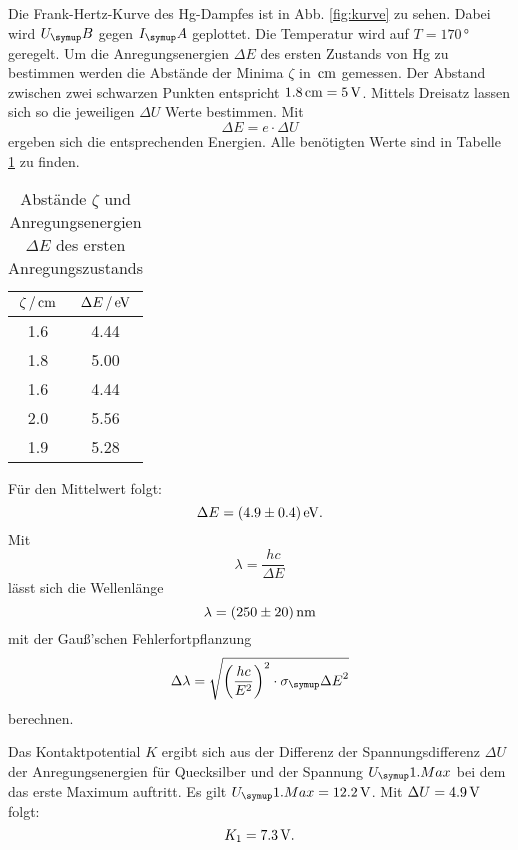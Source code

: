 Die Frank-Hertz-Kurve des Hg-Dampfes ist in Abb. \ref{fig:kurve} zu sehen.
Dabei wird $U_\su{B}$ gegen $I_\su{A}$ geplottet.
Die Temperatur wird auf $T=170\,\si{\degree}$ geregelt. Um die Anregungsenergien
$\Delta E$
des ersten Zustands von Hg zu bestimmen werden die Abstände der Minima $\zeta$ in
$\,\si{\centi\meter}$ gemessen. Der Abstand zwischen zwei schwarzen Punkten entspricht
$1.8\,\si{\centi\meter} = 5\,\si{\volt}$. Mittels Dreisatz lassen sich so die jeweiligen $\Delta U$
Werte bestimmen. Mit
\begin{equation}
  \Delta E = e\cdot \Delta U
\end{equation}
ergeben sich die entsprechenden Energien. Alle benötigten Werte sind in Tabelle
\ref{tab:werte} zu finden.
\begin{table}
  \centering
  \begin{tabular}{c c}
    \toprule
    $\zeta \,/\,\si{\centi\meter}$   & $\Delta E \,/\,\si{\electronvolt}$  \\
    \midrule
    1.6 & 4.44 \\
    1.8 & 5.00 \\
    1.6 & 4.44 \\
    2.0 & 5.56 \\
    1.9 & 5.28 \\
    \bottomrule
  \end{tabular}
  \caption{Abstände $\zeta$ und Anregungsenergien $\Delta E$ des ersten Anregungszustands}
  \label{tab:werte}
\end{table}
Für den Mittelwert folgt:
\begin{equation*}
  \Delta E = (4.9 \pm 0.4) \,\si{\electronvolt}.
\end{equation*}
Mit
\begin{equation}
  \lambda = \frac{hc}{\Delta E} \label{eqn:lambda}
\end{equation}
lässt sich die Wellenlänge
\begin{equation*}
  \lambda = (250 \pm 20)\,\si{\nano\meter}
\end{equation*}
mit der Gauß'schen Fehlerfortpflanzung
\begin{equation*}
  \Delta \lambda = \sqrt{\bigg(\frac{hc}{E^2}\bigg)^2\cdot \sigma_\su{\Delta E}^2}
\end{equation*}
berechnen.

Das Kontaktpotential $K$ ergibt sich aus der Differenz der Spannungsdifferenz $\Delta U$
der Anregungsenergien für Quecksilber und der Spannung $U_\su{1.Max}$ bei dem das
erste Maximum auftritt. Es gilt $U_\su{1.Max} = 12.2\Volt$. Mit $\Delta U = 4.9\,\si{\volt}$
folgt:
\begin{equation}
  K_1 = 7.3\,\si{\volt}.
\end{equation}

